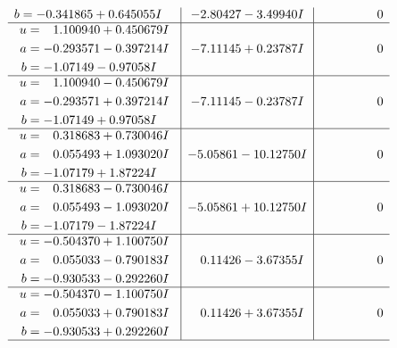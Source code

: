 \documentclass[1p]{elsarticle_modified}
\theoremstyle{definition}
\begin{document}
$$\begin{array}{c|c|c}
\begin{aligned}
b &= -0.341865 + 0.645055 I\end{aligned}
 & -2.80427 - 3.49940 I & \phantom{-0.000000 } 0 \\ \hline\begin{aligned}
u &= \phantom{-}1.100940 + 0.450679 I \\
a &= -0.293571 - 0.397214 I \\
b &= -1.07149 - 0.97058 I\end{aligned}
 & -7.11145 + 0.23787 I & \phantom{-0.000000 } 0 \\ \hline\begin{aligned}
u &= \phantom{-}1.100940 - 0.450679 I \\
a &= -0.293571 + 0.397214 I \\
b &= -1.07149 + 0.97058 I\end{aligned}
 & -7.11145 - 0.23787 I & \phantom{-0.000000 } 0 \\ \hline\begin{aligned}
u &= \phantom{-}0.318683 + 0.730046 I \\
a &= \phantom{-}0.055493 + 1.093020 I \\
b &= -1.07179 + 1.87224 I\end{aligned}
 & -5.05861 - 10.12750 I & \phantom{-0.000000 } 0 \\ \hline\begin{aligned}
u &= \phantom{-}0.318683 - 0.730046 I \\
a &= \phantom{-}0.055493 - 1.093020 I \\
b &= -1.07179 - 1.87224 I\end{aligned}
 & -5.05861 + 10.12750 I & \phantom{-0.000000 } 0 \\ \hline\begin{aligned}
u &= -0.504370 + 1.100750 I \\
a &= \phantom{-}0.055033 - 0.790183 I \\
b &= -0.930533 - 0.292260 I\end{aligned}
 & \phantom{-}0.11426 - 3.67355 I & \phantom{-0.000000 } 0 \\ \hline\begin{aligned}
u &= -0.504370 - 1.100750 I \\
a &= \phantom{-}0.055033 + 0.790183 I \\
b &= -0.930533 + 0.292260 I\end{aligned}
 & \phantom{-}0.11426 + 3.67355 I & \phantom{-0.000000 } 0\\
 \hline 
 \end{array}$$\newpage$$\begin{array}{c|c|c}  

\end{array}$$
\end{document}
